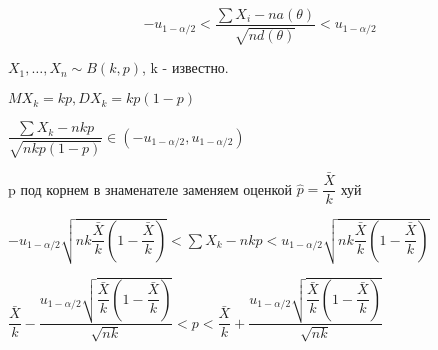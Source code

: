   $$- u_{1 - \alpha/2} < \dfrac{\sum X_i - n a(\theta)}{\sqrt{n d(\theta)}}< u_{1-\alpha/2}$$

\begin{ex}
  $X_1, \dots, X_n \sim B(k, p)$, k - известно.

  $M X_k = kp, D X_k = k p (1-p)$

  $\dfrac{\sum X_k - n k p}{\sqrt{nkp(1-p)}} \in (-u_{1-\alpha/2}, u_{1-\alpha/2})$

  p под корнем в знаменателе заменяем оценкой $\hat p = \dfrac{\bar X}{k}$ хуй

  $-u_{1-\alpha/2} \sqrt{nk \dfrac{\bar X}{k} (1 - \dfrac{\bar X}{k})} < \sum X_k - nkp < u_{1-\alpha/2} \sqrt{nk \dfrac{\bar X}{k} (1 - \dfrac{\bar X}{k})}$

  $\dfrac{\bar X}{k} - \dfrac{u_{1-\alpha/2} \sqrt{\dfrac{\bar X}{k} (1 - \dfrac{\bar X}{k})}}{\sqrt{nk}} < p < \dfrac{\bar X}{k} + \dfrac{u_{1-\alpha/2} \sqrt{\dfrac{\bar X}{k} (1 - \dfrac{\bar X}{k})}}{\sqrt{nk}}$
\end{ex}
